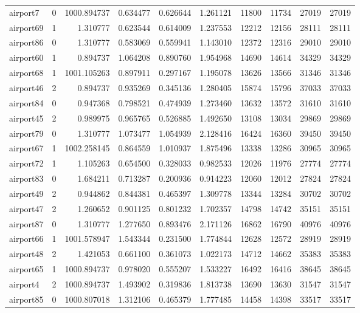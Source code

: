 \begin{longtable}{|l|r|r|r|r|r|r|r|r|r|}
airport7 & 0 & 1000.894737 & 0.634477 & 0.626644 & 1.261121 & 11800 & 11734 & 27019 & 27019 \\
airport69 & 1 & 1.310777 & 0.623544 & 0.614009 & 1.237553 & 12212 & 12156 & 28111 & 28111 \\
airport86 & 0 & 1.310777 & 0.583069 & 0.559941 & 1.143010 & 12372 & 12316 & 29010 & 29010 \\
airport60 & 1 & 0.894737 & 1.064208 & 0.890760 & 1.954968 & 14690 & 14614 & 34329 & 34329 \\
airport68 & 1 & 1001.105263 & 0.897911 & 0.297167 & 1.195078 & 13626 & 13566 & 31346 & 31346 \\
airport46 & 2 & 0.894737 & 0.935269 & 0.345136 & 1.280405 & 15874 & 15796 & 37033 & 37033 \\
airport84 & 0 & 0.947368 & 0.798521 & 0.474939 & 1.273460 & 13632 & 13572 & 31610 & 31610 \\
airport45 & 2 & 0.989975 & 0.965765 & 0.526885 & 1.492650 & 13108 & 13034 & 29869 & 29869 \\
airport79 & 0 & 1.310777 & 1.073477 & 1.054939 & 2.128416 & 16424 & 16360 & 39450 & 39450 \\
airport67 & 1 & 1002.258145 & 0.864559 & 1.010937 & 1.875496 & 13338 & 13286 & 30965 & 30965 \\
airport72 & 1 & 1.105263 & 0.654500 & 0.328033 & 0.982533 & 12026 & 11976 & 27774 & 27774 \\
airport83 & 0 & 1.684211 & 0.713287 & 0.200936 & 0.914223 & 12060 & 12012 & 27824 & 27824 \\
airport49 & 2 & 0.944862 & 0.844381 & 0.465397 & 1.309778 & 13344 & 13284 & 30702 & 30702 \\
airport47 & 2 & 1.260652 & 0.901125 & 0.801232 & 1.702357 & 14798 & 14742 & 35151 & 35151 \\
airport87 & 0 & 1.310777 & 1.277650 & 0.893476 & 2.171126 & 16862 & 16790 & 40976 & 40976 \\
airport66 & 1 & 1001.578947 & 1.543344 & 0.231500 & 1.774844 & 12628 & 12572 & 28919 & 28919 \\
airport48 & 2 & 1.421053 & 0.661100 & 0.361073 & 1.022173 & 14712 & 14662 & 35383 & 35383 \\
airport65 & 1 & 1000.894737 & 0.978020 & 0.555207 & 1.533227 & 16492 & 16416 & 38645 & 38645 \\
airport4 & 2 & 1000.894737 & 1.493902 & 0.319836 & 1.813738 & 13690 & 13630 & 31547 & 31547 \\
airport85 & 0 & 1000.807018 & 1.312106 & 0.465379 & 1.777485 & 14458 & 14398 & 33517 & 33517 \\

\end{longtable}
